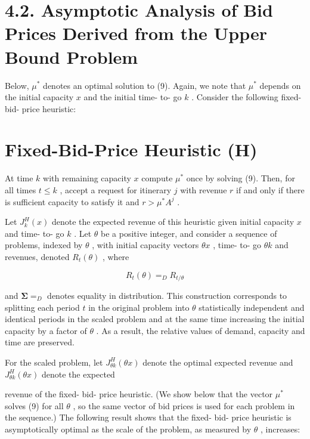 


\section{4.2. Asymptotic Analysis of Bid Prices Derived from the Upper
Bound
Problem}\label{asymptotic-analysis-of-bid-prices-derived-from-the-upper-bound-problem}

Below, \(\mu^{*}\) denotes an optimal solution to (9). Again, we note
that \(\mu^{*}\) depends on the initial capacity \(x\) and the initial
time- to- go \(k\) . Consider the following fixed- bid- price heuristic:

\section{Fixed-Bid-Price Heuristic
(H)}\label{fixed-bid-price-heuristic-h}

At time \(k\) with remaining capacity \(x\) compute \(\mu^{*}\) once by
solving (9). Then, for all times \(t \leq k\) , accept a request for
itinerary \(j\) with revenue \(r\) if and only if there is sufficient
capacity to satisfy it and \(r > \mu^{*}A^{j}\) .

Let \(J_{k}^{H}(x)\) denote the expected revenue of this heuristic given
initial capacity \(x\) and time- to- go \(k\) . Let \(\theta\) be a
positive integer, and consider a sequence of problems, indexed by
\(\theta\) , with initial capacity vectors \(\theta x\) , time- to- go
\(\theta k\) and revenues, denoted \(R_{t}(\theta)\) , where

\[
R_{t}(\theta) = _{D}R_{t / \theta} \tag{12}
\]

and \(\mathbf{\Sigma} = _{D}\) denotes equality in distribution. This
construction corresponds to splitting each period \(t\) in the original
problem into \(\theta\) statistically independent and identical periods
in the scaled problem and at the same time increasing the initial
capacity by a factor of \(\theta\) . As a result, the relative values of
demand, capacity and time are preserved.

For the scaled problem, let \(J_{\theta k}^{H}(\theta x)\) denote the
optimal expected revenue and \(J_{\theta k}^{H}(\theta x)\) denote the
expected

revenue of the fixed- bid- price heuristic. (We show below that the
vector \(\mu^{*}\) solves (9) for all \(\theta\) , so the same vector of
bid prices is used for each problem in the sequence.) The following
result shows that the fixed- bid- price heuristic is asymptotically
optimal as the scale of the problem, as measured by \(\theta\) ,
increases:

